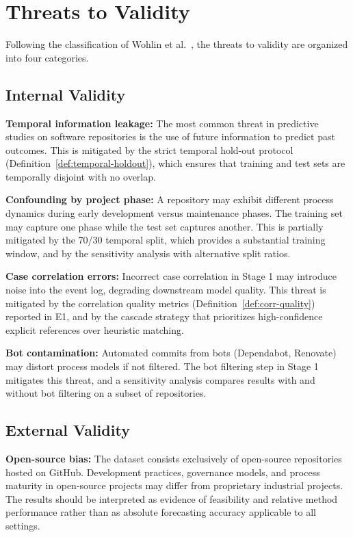 \section{Threats to Validity}
\label{sec:threats}

Following the classification of Wohlin et 
al.~\cite{wohlin2012experimentation}, the threats to validity are 
organized into four categories.


\subsection{Internal Validity}
\label{sec:threats-internal}

\textbf{Temporal information leakage:} The most common threat in 
predictive studies on software repositories is the use of future 
information to predict past outcomes. This is mitigated by the strict 
temporal hold-out protocol (Definition~\ref{def:temporal-holdout}), 
which ensures that training and test sets are temporally disjoint with 
no overlap.

\textbf{Confounding by project phase:} A repository may exhibit 
different process dynamics during early development versus maintenance 
phases. The training set may capture one phase while the test set 
captures another. This is partially mitigated by the 70/30 temporal 
split, which provides a substantial training window, and by the 
sensitivity analysis with alternative split ratios.

\textbf{Case correlation errors:} Incorrect case correlation in Stage 1 
may introduce noise into the event log, degrading downstream model 
quality. This threat is mitigated by the correlation quality metrics 
(Definition~\ref{def:corr-quality}) reported in E1, and by the cascade 
strategy that prioritizes high-confidence explicit references over 
heuristic matching.

\textbf{Bot contamination:} Automated commits from bots (Dependabot, 
Renovate) may distort process models if not filtered. The bot filtering 
step in Stage 1 mitigates this threat, and a sensitivity analysis 
compares results with and without bot filtering on a subset of 
repositories.


\subsection{External Validity}
\label{sec:threats-external}

\textbf{Open-source bias:} The dataset consists exclusively of 
open-source repositories hosted on GitHub. Development practices, 
governance models, and process maturity in open-source projects may 
differ from proprietary industrial projects. The results should be 
interpreted as evidence of feasibility and relative method performance 
rather than as absolute forecasting accuracy applicable to all settings.


